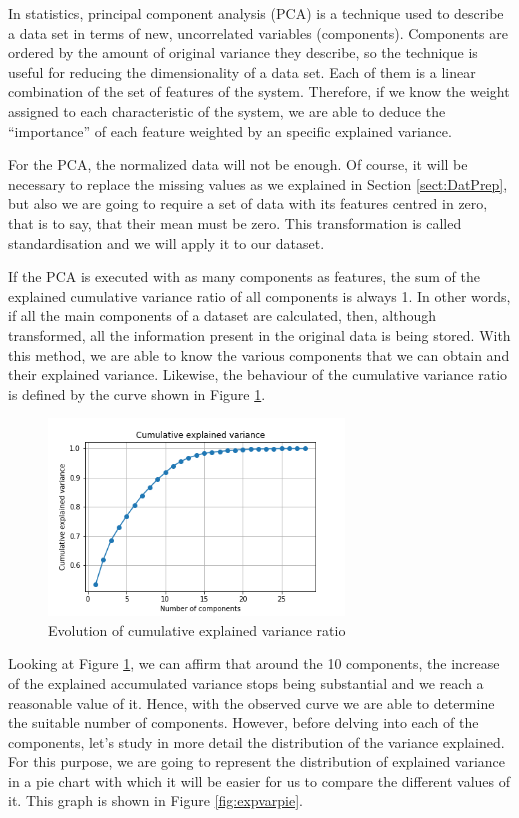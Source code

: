 In statistics, principal component analysis (PCA) is a technique used to describe a data set in terms of new, uncorrelated variables (components). Components are ordered by the amount of original variance they describe, so the technique is useful for reducing the dimensionality of a data set. Each of them is a linear combination of the set of features of the system. Therefore, if we know the weight assigned to each characteristic of the system, we are able to deduce the ``importance'' of each feature weighted by an specific explained variance.

For the PCA, the normalized data will not be enough. Of course, it will be necessary to replace the missing values as we explained in Section \ref{sect:DatPrep}, but also we are going to require a set of data with its features centred in zero, that is to say, that their mean must be zero. This transformation is called standardisation and we will apply it to our dataset.

If the PCA is executed with as many components as features, the sum of the explained cumulative variance ratio of all components is always 1. In other words, if all the main components of a dataset are calculated, then, although transformed, all the information present in the original data is being stored. With this method, we are able to know the various components that we can obtain and their explained variance. Likewise, the behaviour of the cumulative variance ratio is defined by the curve shown in Figure \ref{fig:cumexpvar}.

\begin{figure}
	\centering%
	\centerline{\includegraphics[width=0.7\textwidth]{Imagenes/Bitmap/PCA/cumexpvar.png}}%
	\caption{Evolution of cumulative explained variance ratio}%
	\label{fig:cumexpvar}
\end{figure}

Looking at Figure \ref{fig:cumexpvar}, we can affirm that around the 10 components, the increase of the explained accumulated variance stops being substantial and we reach a reasonable value of it. Hence, with the observed curve we are able to determine the suitable number of components. However, before delving into each of the components, let's study in more detail the distribution of the variance explained. For this purpose, we are going to represent the distribution of explained variance in a pie chart with which it will be easier for us to compare the different values of it. This graph is shown in Figure \ref{fig:expvarpie}.

